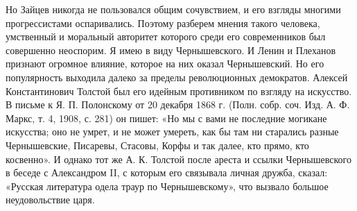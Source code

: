 Но  Зайцев никогда  не пользовался  общим сочувствием,  и его  взгляды
многими  прогрессистами оспаривались.  Поэтому разберем  мнения такого
человека,  умственный   и  моральный  авторитет  которого   среди  его
современников был  совершенно неоспорим. Я имею  в виду Чернышевского.
И  Ленин  и  Плеханов  признают   огромное  влияние,  которое  на  них
оказал Чернышевский.  Но его  популярность выходила далеко  за пределы
революционных  демократов.  Алексей  Константинович  Толстой  был  его
идейным  противником  по  взгляду  на  искусство. В  письме  к  Я.  П.
Полонскому от 20  декабря 1868 г. (Полн. собр. соч.  Изд. А. Ф. Маркс,
т. 4,  1908, с.  281) он пишет:  «Но мы с  вами не  последние могикане
искусства; оно не  умрет, и не может умереть, как  бы там ни старались
разные Чернышевские, Писаревы, Стасовы, Корфы  и так далее, кто прямо,
кто  косвенно».  И  однако  тот  же  А.  К.  Толстой  после  ареста  и
ссылки  Чернышевского  в  беседе  с  Александром  II,  с  которым  его
связывала личная  дружба, сказал:  «Русская литература одела  траур по
Чернышевскому», что вызвало большое неудовольствие царя.

